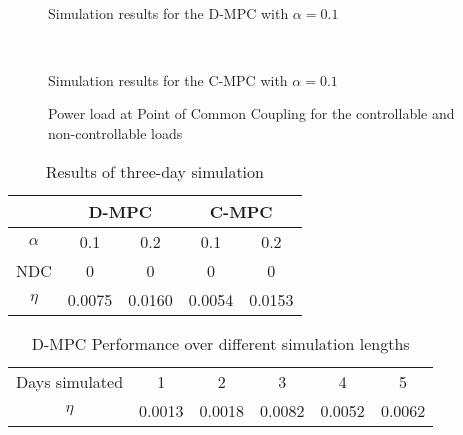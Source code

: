 \begin{figure}[!t]
\centering
{}
\\
\caption{Simulation results for the D-MPC with $\alpha=0.1$}
\label{fig:dmpcsimres}
\end{figure}

\begin{figure}[!t]
\centering
{}
\\
\centering
\caption{Simulation results for the C-MPC with $\alpha=0.1$}
\label{fig:cmpcsimres}
\end{figure}

\begin{figure}[!t]
\centerline{
}
\centering
\caption{Power load at Point of Common Coupling for the controllable and non-controllable loads}
\label{fig:pccsimres}
\end{figure}

\begin{table}
\caption{Results of three-day simulation}\label{tab:comparison}
\centering
\begin{tabular}{c|c c c c}
\hline
&\multicolumn{2}{c}{D-MPC} & \multicolumn{2}{c}{C-MPC} \\
\hline
$\alpha$ & 0.1 &0.2&0.1&0.2\\
NDC&0 &0 &0 &0\\
$\eta$&0.0075 &0.0160&0.0054&0.0153\\
\hline
\end{tabular}
\end{table}

\begin{table}
	\caption{D-MPC Performance over different simulation lengths}\label{tab:days}
	\centering
\begin{tabular}{c|c c c c c}
\hline
Days simulated & 1 & 2 & 3 & 4 & 5 \\
$\eta$ &0.0013&0.0018 &0.0082&0.0052&0.0062\\
\hline
\end{tabular}
\end{table}
